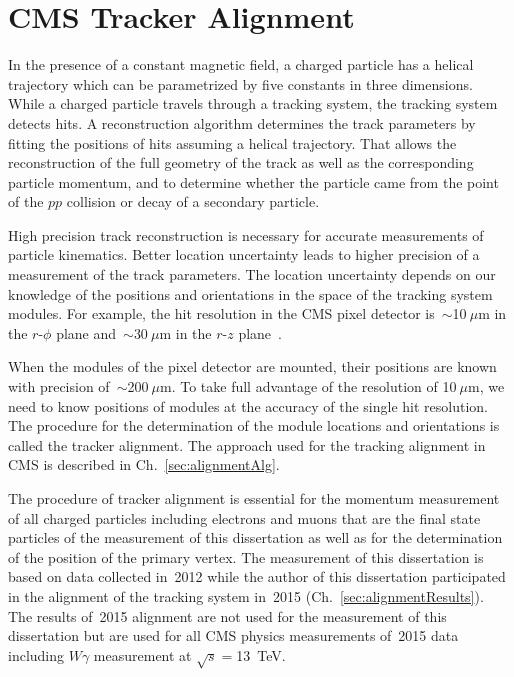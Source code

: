 \chapter{CMS Tracker Alignment} %
\label{sec:alignment}

In the presence of a constant magnetic field, a charged particle has a helical trajectory which can be parametrized by five constants in three dimensions. While a charged particle travels through a tracking system, the tracking system detects hits. A reconstruction algorithm determines the track parameters by fitting the positions of hits assuming a helical trajectory. That allows the reconstruction of the full geometry of the track as well as the corresponding particle momentum, and to determine whether the particle came from the point of the $pp$ collision or decay of a secondary particle.

High precision track reconstruction is necessary for accurate measurements of particle kinematics. Better location uncertainty leads to higher precision of a measurement of the track parameters. The location uncertainty depends on our knowledge of the positions and orientations in the space of the tracking system modules. For example, the hit resolution in the CMS pixel detector is~$\sim$10$~\mu$m in the $r$-$\phi$ plane and~$\sim$30$~\mu$m in the $r$-$z$ plane~\cite{ref_trackerPerformance}. 

When the modules of the pixel detector are mounted, their positions are known with precision of~$\sim$200$~\mu$m. To take full advantage of the resolution of 10$~\mu$m, we need to know positions of modules at the accuracy of the single hit resolution. The procedure for the determination of the module locations and orientations is called the tracker alignment. The approach used for the tracking alignment in CMS is described in Ch.~\ref{sec:alignmentAlg}.

The procedure of tracker alignment is essential for the momentum measurement of all charged particles including electrons and muons that are the final state particles of the measurement of this dissertation as well as for the determination of the position of the primary vertex. The measurement of this dissertation is based on data collected in~2012 while the author of this dissertation participated in the alignment of the tracking system in~2015 (Ch.~\ref{sec:alignmentResults}). The results of~2015 alignment are not used for the measurement of this dissertation but are used for all CMS physics measurements of~2015 data including $W\gamma$ measurement at $\sqrt{s}=$13~TeV. 

